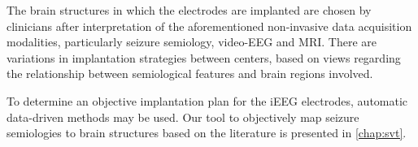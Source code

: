 The brain structures in which the electrodes are implanted are chosen by clinicians after interpretation of the aforementioned non-invasive data acquisition modalities, particularly seizure semiology, video-\ac{EEG} and \ac{MRI}.
There are variations in implantation strategies between centers, based on views regarding the relationship between semiological features and brain regions involved.

To determine an objective implantation plan for the \ac{iEEG} electrodes, automatic data-driven methods may be used.
Our tool to objectively map seizure semiologies to brain structures based on the literature is presented in \cref{chap:svt}.
